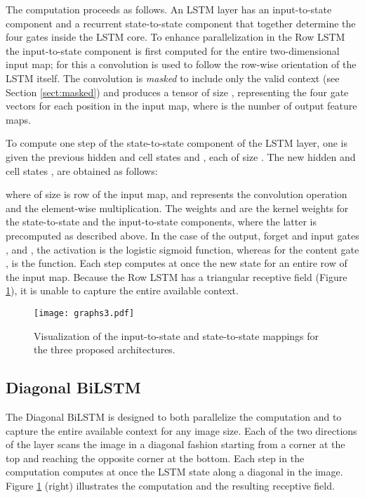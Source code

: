 \documentclass{article}
\begin{document}
The computation proceeds as follows. An LSTM layer has an {input-to-state} component and a recurrent {state-to-state} component that together determine the four gates inside the LSTM core. To enhance parallelization in the Row LSTM the input-to-state component is first computed for the entire two-dimensional input map; for this a  convolution is used to follow the row-wise orientation of the LSTM itself. The convolution is \emph{masked} to include only the valid context (see Section \ref{sect:masked}) and produces a tensor of size , representing the four gate vectors for each position in the input map, where  is the number of output feature maps.

 To compute one step of the state-to-state component of the LSTM layer, one is given the previous hidden and cell states  and , each of size . The new hidden and cell states ,  are obtained as follows:

 \vspace{-0.2cm}
 

where  of size  is row  of the input map, and  represents the convolution operation and  the element-wise multiplication. The weights  and  are the kernel weights for the state-to-state and the input-to-state components, where the latter is precomputed as described above. In the case of the output, forget and input gates ,  and , the activation  is the logistic sigmoid function, whereas for the content gate ,  is the  function. Each step computes at once the new state for an entire row of the input map. Because the Row LSTM has a triangular receptive field (Figure \ref{mappings}), it is unable to capture the entire available context.

\begin{figure}[ht]
\texttt{[image: graphs3.pdf]}
\vspace{-0.7cm}
\caption{Visualization of the input-to-state and state-to-state mappings for the three proposed architectures.}
\label{mappings}
\vspace{-0.2cm}
\end{figure}

\subsection{Diagonal BiLSTM}
\label{sect:diag_lstm}

The Diagonal BiLSTM is designed to both parallelize the computation and to capture the entire available context for any image size. Each of the two directions of the layer scans the image in a diagonal fashion starting from a corner at the top and reaching the opposite corner at the bottom. Each step in the computation computes at once the LSTM state along a diagonal in the image. Figure \ref{mappings} (right) illustrates the computation and the resulting receptive field.
\end{document}
